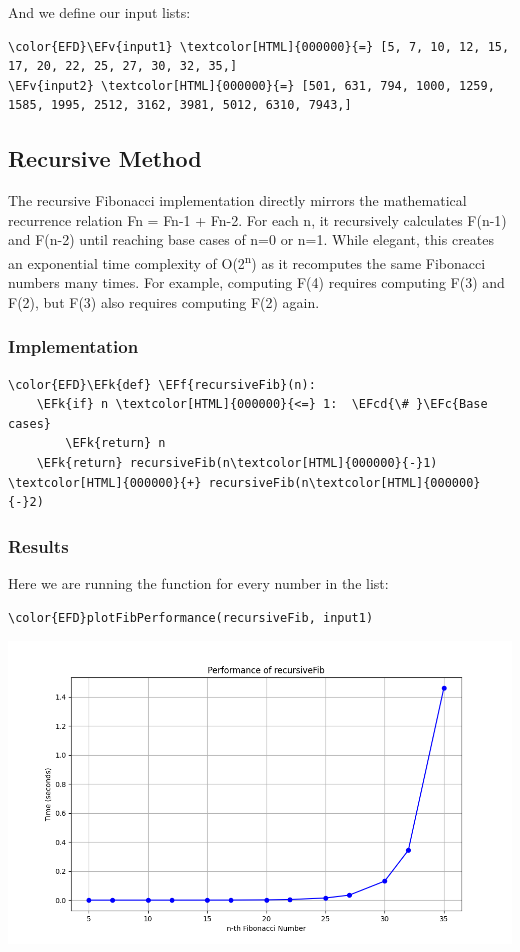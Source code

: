 \documentclass[a4paper,12pt]{article}
\newcommand{\EFc}[1]{\textcolor{EFc}{#1}} %
\newcommand{\EFcd}[1]{\textcolor{EFcd}{#1}} %
\newcommand{\EFk}[1]{\textcolor{EFk}{#1}} %
\newcommand{\EFf}[1]{\textcolor{EFf}{#1}} %
\newcommand{\EFv}[1]{\textcolor{EFv}{#1}} %
\begin{document}
And we define our input lists:
\begin{Code}
\begin{Verbatim}
\color{EFD}\EFv{input1} \textcolor[HTML]{000000}{=} [5, 7, 10, 12, 15, 17, 20, 22, 25, 27, 30, 32, 35,]
\EFv{input2} \textcolor[HTML]{000000}{=} [501, 631, 794, 1000, 1259, 1585, 1995, 2512, 3162, 3981, 5012, 6310, 7943,]
\end{Verbatim}
\end{Code}
\subsection{Recursive Method}
\label{sec:org3131b41}
The recursive Fibonacci implementation directly mirrors the mathematical recurrence relation Fn = Fn-1 + Fn-2. For each n, it recursively calculates F(n-1) and F(n-2) until reaching base cases of n=0 or n=1. While elegant, this creates an exponential time complexity of O(2\textsuperscript{n}) as it recomputes the same Fibonacci numbers many times. For example, computing F(4) requires computing F(3) and F(2), but F(3) also requires computing F(2) again.
\subsubsection{Implementation}
\label{sec:org35cc891}
\begin{Code}
\begin{Verbatim}
\color{EFD}\EFk{def} \EFf{recursiveFib}(n):
    \EFk{if} n \textcolor[HTML]{000000}{<=} 1:  \EFcd{\# }\EFc{Base cases}
        \EFk{return} n
    \EFk{return} recursiveFib(n\textcolor[HTML]{000000}{-}1) \textcolor[HTML]{000000}{+} recursiveFib(n\textcolor[HTML]{000000}{-}2)
\end{Verbatim}
\end{Code}
\subsubsection{Results}
\label{sec:org98cdcaf}
Here we are running the function for every number in the list:
\begin{Code}
\begin{Verbatim}
\color{EFD}plotFibPerformance(recursiveFib, input1)
\end{Verbatim}
\end{Code}

\begin{center}
\includegraphics[width=.9\linewidth]{recursiveFib.png}
\label{org5b4a76a}
\end{center}
\end{document}
